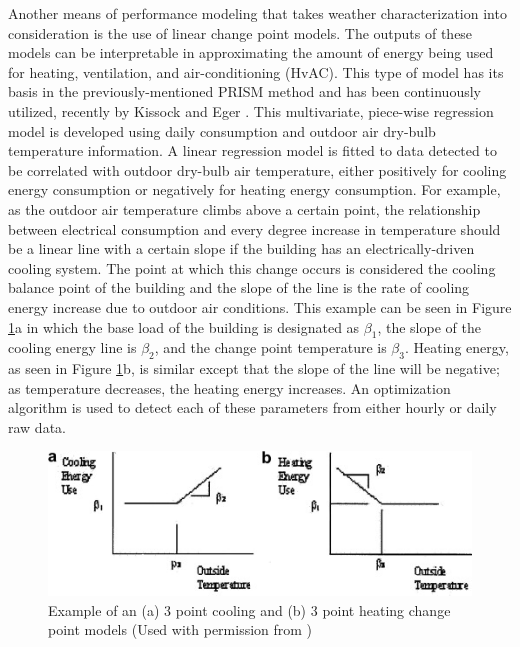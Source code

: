 Another means of performance modeling that takes weather characterization into consideration is the use of linear change point models. The outputs of these models can be interpretable in approximating the amount of energy being used for heating, ventilation, and air-conditioning (HvAC). This type of model has its basis in the previously-mentioned PRISM method and has been continuously utilized, recently by Kissock and Eger \citep{Kelly_Kissock_2008}. This multivariate, piece-wise regression model is developed using daily consumption and outdoor air dry-bulb temperature information. A linear regression model is fitted to data detected to be correlated with outdoor dry-bulb air temperature, either positively for cooling energy consumption or negatively for heating energy consumption. For example, as the outdoor air temperature climbs above a certain point, the relationship between electrical consumption and every degree increase in temperature should be a linear line with a certain slope if the building has an electrically-driven cooling system. The point at which this change occurs is considered the cooling balance point of the building and the slope of the line is the rate of cooling energy increase due to outdoor air conditions. This example can be seen in Figure \ref{fig:changepointmodels}a in which the base load of the building is designated as $\beta_1$, the slope of the cooling energy line is $\beta_2$, and the change point temperature is $\beta_3$. Heating energy, as seen in Figure \ref{fig:changepointmodels}b, is similar except that the slope of the line will be negative; as temperature decreases, the heating energy increases. An optimization algorithm is used to detect each of these parameters from either hourly or daily raw data.

\begin{figure}[ht!]
\begin{center}
\includegraphics[width=0.84\columnwidth]{figures/changepointmodel_kissock/changepointmodel_kissock}
\caption{Example of an (a) 3 point cooling and (b) 3 point heating change point models (Used with permission from \citep{kelly_kissock_measuring_2008})
\label{fig:changepointmodels}%
}
\end{center}
\end{figure}

